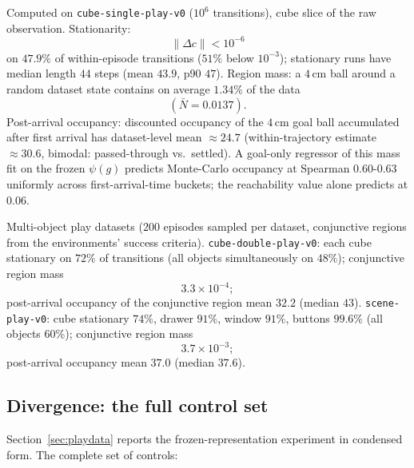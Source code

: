 \documentclass{article}
\newcommand{\cube}{c}
\begin{document}
Computed on \texttt{cube-single-play-v0} ($10^6$ transitions), cube slice of the raw observation.
Stationarity:
\begin{equation}
\|\Delta\cube\|<10^{-6}
\end{equation}
on $47.9\%$ of within-episode transitions ($51\%$ below $10^{-3}$); stationary runs have median length $44$ steps (mean $43.9$, p90 $47$).
Region mass: a $4$\,cm ball around a random dataset state contains on average $1.34\%$ of the data
\begin{equation}
(\bar N=0.0137).
\end{equation}
Post-arrival occupancy: discounted occupancy of the $4$\,cm goal ball accumulated after first arrival has dataset-level mean $\approx24.7$ (within-trajectory estimate $\approx30.6$, bimodal: passed-through vs.\ settled).
A goal-only regressor of this mass fit on the frozen $\psi(g)$ predicts Monte-Carlo occupancy at Spearman $0.60$-$0.63$ uniformly across first-arrival-time buckets; the reachability value alone predicts at $0.06$.

Multi-object play datasets ($200$ episodes sampled per dataset, conjunctive regions from the environments' success criteria).
\texttt{cube-double-play-v0}: each cube stationary on $72\%$ of transitions (all objects simultaneously on $48\%$); conjunctive region mass
\begin{equation}
3.3\times10^{-4};
\end{equation}
post-arrival occupancy of the conjunctive region mean $32.2$ (median $43$).
\texttt{scene-play-v0}: cube stationary $74\%$, drawer $91\%$, window $91\%$, buttons $99.6\%$ (all objects $60\%$); conjunctive region mass
\begin{equation}
3.7\times10^{-3};
\end{equation}
post-arrival occupancy mean $37.0$ (median $37.6$).

\subsection{Divergence: the full control set}
\label{app:diverge}

Section~\ref{sec:playdata} reports the frozen-representation experiment in condensed form.
The complete set of controls:
\end{document}
